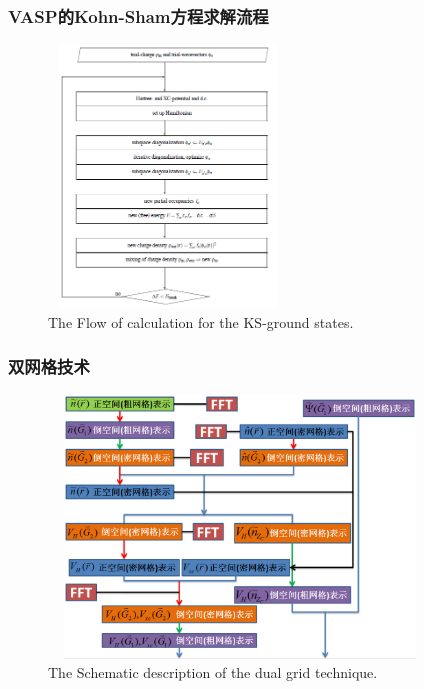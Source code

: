 \frame
{
	\frametitle{\textrm{VASP}的\textrm{Kohn-Sham}方程求解流程}
\begin{figure}[h!]
	\vspace{-0.2in}
\centering
\includegraphics[height=2.75in,width=2.5in,viewport=0 0 480 630,clip]{Figures/VASP_procedure.png}
\caption{\tiny \textrm{The Flow of calculation for the KS-ground states.}}%
\label{PAW_baiseset}
\end{figure} 
}

\frame
{
	\frametitle{双网格技术}
\begin{figure}[h!]
	\vspace{-0.15in}
\centering
\includegraphics[height=2.75in,width=4.0in,viewport=0 0 800 600,clip]{Figures/dual_grid-2.png}
\caption{\tiny \textrm{The Schematic description of the dual grid technique.}}%
\label{PAW_dualgrid}
\end{figure} 
}


